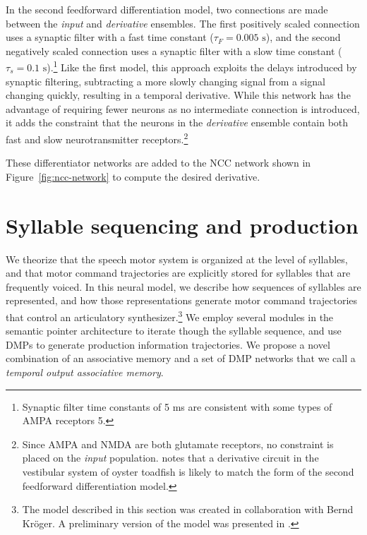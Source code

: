 In the second feedforward differentiation model,
two connections are made between
the \textit{input} and \textit{derivative} ensembles.
The first positively scaled connection
uses a synaptic filter with a fast time constant
($\tau_F=0.005 \text{ s}$),
and the second negatively scaled connection
uses a synaptic filter with a slow time constant
($\tau_s=0.1 \text{ s}$).\footnote{
  Synaptic filter time constants of 5 ms
  are consistent with some types of
  AMPA receptors \cite{jonas1993}5.}
Like the first model,
this approach exploits the delays introduced
by synaptic filtering,
subtracting a more slowly changing signal
from a signal changing quickly,
resulting in a temporal derivative.
While this network has the advantage
of requiring fewer neurons
as no intermediate connection is introduced,
it adds the constraint that
the neurons in the \textit{derivative} ensemble
contain both fast and slow
neurotransmitter receptors.\footnote{
  Since AMPA and NMDA are both glutamate receptors,
  no constraint is placed on the \textit{input} population.
  \cite{tripp2001} notes that a derivative circuit
  in the vestibular system of oyster toadfish
  \cite{holstein2004}
  is likely to match the form of the second
  feedforward differentiation model.}

These differentiator networks
are added to the NCC network
shown in Figure~\ref{fig:ncc-network}
to compute the desired derivative.


\section{Syllable sequencing and production}


We theorize that the speech motor system
is organized at the level of syllables,
and that motor command trajectories are explicitly stored
for syllables that are frequently voiced.
In this neural model,
we describe how sequences of syllables are represented,
and how those representations
generate motor command trajectories
that control an articulatory synthesizer.\footnote{
  The model described in this section was created
  in collaboration with Bernd Kr\"{o}ger.
  A preliminary version of the model was presented
  in \cite{kroger2014}.}
We employ several modules in the semantic pointer architecture
to iterate though the syllable sequence,
and use DMPs to generate production information trajectories.
We propose a novel combination of an associative memory
and a set of DMP networks
that we call a \textit{temporal output associative memory}.

